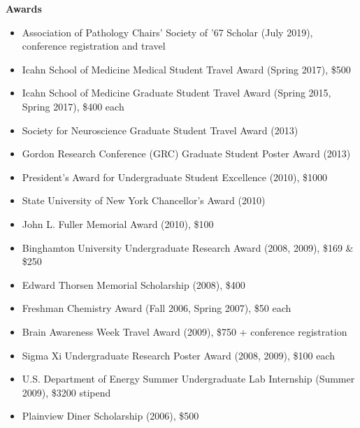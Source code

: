 \documentclass[10pt]{article}
\begin{document}
\vspace{0.1in}
{\large \textbf{Awards}}

\begin{itemize}
  \item Association of Pathology Chairs' Society of '67 Scholar (July 2019), conference registration and travel
  \item Icahn School of Medicine Medical Student Travel Award (Spring 2017), \$500
  \item Icahn School of Medicine Graduate Student Travel Award (Spring 2015, Spring 2017), \$400 each
  \item Society for Neuroscience Graduate Student Travel Award (2013)
  \item Gordon Research Conference (GRC) Graduate Student Poster Award (2013)
  \item President's Award for Undergraduate Student Excellence (2010), \$1000
  \item State University of New York Chancellor's Award (2010)
  \item John L. Fuller Memorial Award (2010), \$100
  \item Binghamton University Undergraduate Research Award (2008, 2009), \$169 \& \$250
  \item Edward Thorsen Memorial Scholarship (2008), \$400
  \item Freshman Chemistry Award (Fall 2006, Spring 2007), \$50 each
  \item Brain Awareness Week Travel Award (2009), \$750 + conference registration
  \item Sigma Xi Undergraduate Research Poster Award (2008, 2009), \$100 each
  \item U.S. Department of Energy Summer Undergraduate Lab Internship (Summer 2009), \$3200 stipend
  \item Plainview Diner Scholarship (2006), \$500

\end{itemize}
\end{document}
